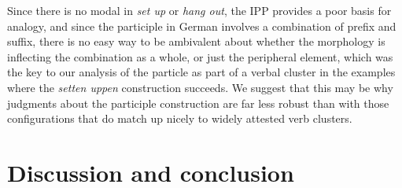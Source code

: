 \documentclass[output=paper]{langscibook}
\begin{document}
\z 

Since there is no modal in \textit{set up} or \textit{hang out}, the IPP provides a poor basis for analogy, and since the participle in German involves a combination of prefix and suffix, there is no easy way to be ambivalent about whether the morphology is inflecting the combination as a whole, or just the peripheral element, which was the key to our analysis of the particle as part of a verbal cluster in the examples where the \textit{setten uppen} construction succeeds. We suggest that this may be why judgments about the participle construction are far less robust than with those configurations that do match up nicely to widely attested verb clusters. 

\section{Discussion and conclusion}
\end{document}
